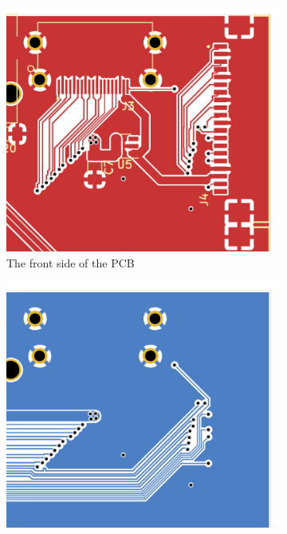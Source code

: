 \begin{figure}[t]
  \centering
  \begin{subfigure}{.33\textwidth}
    \centering
    \includegraphics[width=1\linewidth]{Figures/kicad/close-ups/hdmi-front}
    \caption{The front side of the PCB}
    \label{fig:HDMICircuitFront}
  \end{subfigure}%
  \begin{subfigure}{.33\textwidth}
    \centering
    \includegraphics[width=1\linewidth]{Figures/kicad/close-ups/hdmi-back}

\end{subfigure}
\end{figure}
